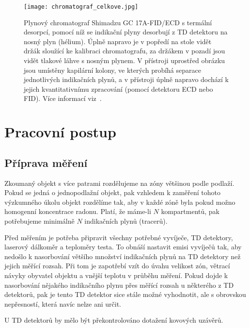 \begin{figure}[ht]
    \centering
    \texttt{[image: chromatograf\_celkove.jpg]}
    \caption{Plynový chromatograf Shimadzu GC 17A-FID/ECD s termální desorpcí, pomocí níž se indikační plyny desorbují z TD detektoru na nosný plyn (hélium). Úplně napravo je v popředí na stole vidět držák sloužící ke kalibraci chromatografu, za držákem v pozadí jsou vidět tlakové láhve s nosným plynem. V přístroji uprostřed obrázku jsou umístěny kapilární kolony, ve kterých probíhá separace jednotlivých indikačních plynů, a v přístroji úplně napravo dochází k jejich kvantitativnímu zpracování (pomocí detektoru ECD nebo FID). Více informací viz~\cite{metodika}.}
    \label{fig:prutoky_chromatograf}
\end{figure}

\section{Pracovní postup}
\subsection{Příprava měření}
Zkoumaný objekt s více patrami rozdělujeme na zóny většinou podle podlaží. Pokud se jedná o jednopodlažní objekt, pak vzhledem k zaměření tohoto výzkumného úkolu objekt rozdělíme tak, aby v každé zóně byla pokud možno homogenní koncentrace radonu. Platí, že máme-li $N$ kompartmentů, pak potřebujeme minimálně $N$ indikačních plynů (tracerů). 

Před měřením je potřeba připravit všechny potřebné vyvíječe, TD detektory, laserový dálkoměr a teploměry testa. To obnáší nastavit emisi vyvíječů tak, aby nedošlo k nasorbování většího množství indikačních plynů na TD detektory než jejich měřící rozsah. Při tom je zapotřebí vzít do úvahu velikost zón, větrací návyky obyvatel objektu a vnější teplotu v průběhu měření. Pokud dojde k nasorbování nějakého indikačního plynu přes měřící rozsah u některého z TD detektorů, pak je tento TD detektor sice stále možné vyhodnotit, ale s obrovskou nepřesností, která navíc nelze ani určit. 

U TD detektorů by mělo být překontrolováno dotažení kovových uzávěrů.
